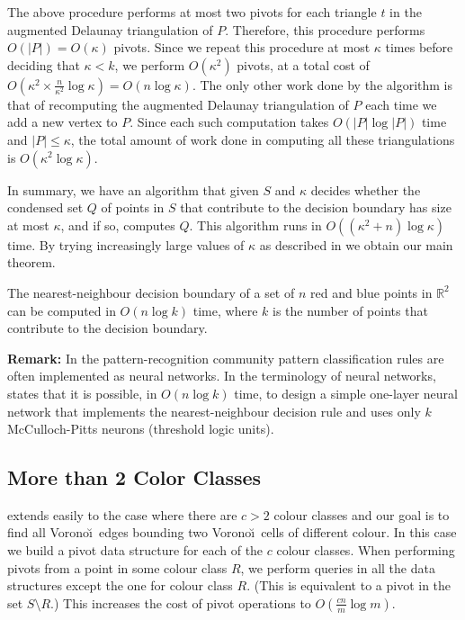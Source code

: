 \documentclass[lotsofwhite,charterfonts]{patmorin}
\newcommand{\voronoi}{Vorono\u\i}
\begin{document}
The above procedure performs at most two pivots for each triangle $t$
in the augmented Delaunay triangulation of $P$.  Therefore, this
procedure performs $O(|P|)=O(\kappa)$ pivots.  Since we repeat this
procedure at most $\kappa$ times before deciding that $\kappa<k$, we
perform $O(\kappa^2)$ pivots, at a total cost of
$O(\kappa^2\times\frac{n}{\kappa^2}\log\kappa)=O(n\log\kappa)$.  The
only other work done by the algorithm is that of recomputing the
augmented Delaunay triangulation of $P$ each time we add a new vertex
to $P$.  Since each such computation takes $O(|P|\log|P|)$ time and
$|P|\le\kappa$, the total amount of work done in computing all these
triangulations is $O(\kappa^2\log\kappa)$.

In summary, we have an algorithm that given $S$ and $\kappa$ decides
whether the condensed set $Q$ of points in $S$ that contribute to the
decision boundary has size at most $\kappa$, and if so, computes $Q$.
This algorithm runs in $O((\kappa^2 + n)\log\kappa)$ time.  By trying
increasingly large values of $\kappa$ as described in 
we obtain our main theorem.

\begin{thm}
The nearest-neighbour decision boundary of a set of $n$ red and blue
points in $\mathbb{R}^2$ can be computed in $O(n\log k)$ time, where
$k$ is the number of points that contribute to the decision boundary.
\end{thm}


\noindent\textbf{Remark:} In the pattern-recognition community pattern
classification rules are often implemented as neural networks.  In the
terminology of neural networks,  states that it is
possible, in $O(n\log k)$ time, to design a simple one-layer neural
network that implements the nearest-neighbour decision rule and uses
only $k$ McCulloch-Pitts neurons (threshold logic units).

\subsection{More than 2 Color Classes}

 extends easily to the case where there are $c>2$ colour
classes and our goal is to find all \voronoi\ edges bounding two
\voronoi\ cells of different colour.  In this case we build a pivot
data structure for each of the $c$ colour classes.  When performing
pivots from a point in some colour class $R$, we perform queries in
all the data structures except the one for colour class $R$.  (This is
equivalent to a pivot in the set $S\setminus R$.)  This increases the
cost of pivot operations to $O(\frac{cn}{m}\log m)$.
\end{document}
